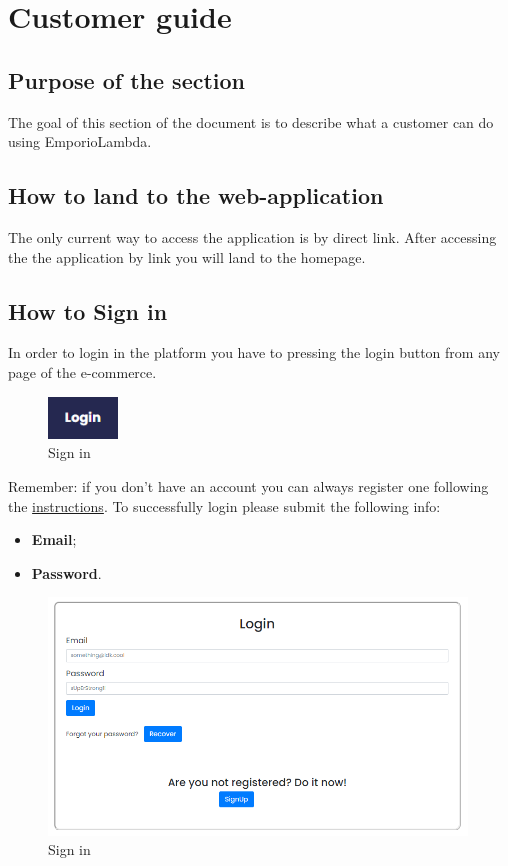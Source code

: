 \section{Customer guide} \label{_cliente}
\subsection{Purpose of the section}
The goal of this section of the document is to describe what a customer can do using EmporioLambda.

\subsection{How to land to the web-application} \label{_homepage}
The only current way to access the application is by direct link. After accessing the the application by link you will land to the homepage.

\subsection{How to Sign in} \label{_signin}
In order to login in the platform you have to pressing the login button from any page of the e-commerce.
\begin{figure}[H]
    \centering
    \includegraphics[width=5em]{res/images/cliente/loginbutton.png}
    \caption{Sign in}
\end{figure}

Remember: if you don't have an account you can always register one following the \hyperref[_signup]{instructions}.
To successfully login please submit the following info: 

\begin{itemize} 
    \item \textbf{Email};
    \item \textbf{Password}.
\end{itemize}

\begin{figure}[H]
    \centering
    \includegraphics[width=30em]{res/images/cliente/signin.png}
    \caption{Sign in}
\end{figure}

